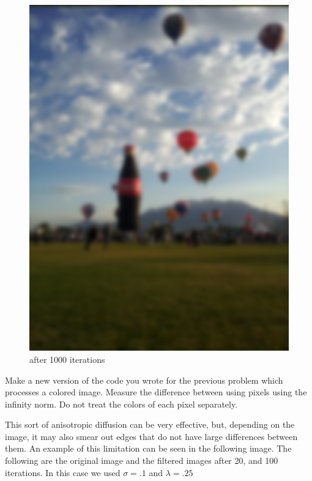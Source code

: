 \begin{figure}[ht]
\hspace{0.5cm}
\begin{minipage}[b]{0.45\linewidth}
\centering
\includegraphics[width=\textwidth]{baloon_col1000}
\caption*{after 1000 iterations}
\end{minipage}
\end{figure}
\vfill
\clearpage

\begin{problem}
Make a new version of the code you wrote for the previous problem which processes a colored image.
Measure the difference between using pixels using the infinity norm.
Do not treat the colors of each pixel separately.
\end{problem}

This sort of anisotropic diffusion can be very effective, but, depending on the image, it may also smear out edges that do not have large differences between them.
An example of this limitation can be seen in the following image.
The following are the original image and the filtered images after 20, and 100 iterations.
In this case we used $\sigma = .1$ and $\lambda = .25$

